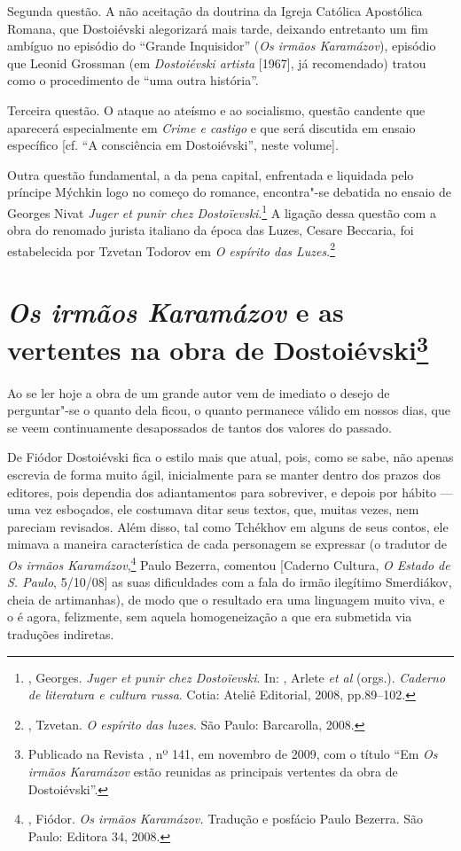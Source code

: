 Segunda questão. A não aceitação da doutrina da Igreja Católica
Apostólica Romana, que Dostoiévski alegorizará mais tarde,
deixando entretanto um fim ambíguo no episódio do ``Grande
Inquisidor'' (\emph{Os irmãos Karamázov}), episódio que
Leonid Grossman (em \emph{Dostoiévski artista} [1967],
já recomendado) tratou como o procedimento de ``uma outra
história''.

Terceira questão. O ataque ao ateísmo e ao socialismo, questão
candente que aparecerá especialmente em \emph{Crime e castigo}
e que será discutida em ensaio específico [cf.
``A consciência em Dostoiévski'', neste volume].

Outra questão fundamental, a da pena capital, enfrentada e
liquidada pelo príncipe Mýchkin logo no começo do romance,
encontra"-se debatida no ensaio de Georges Nivat \emph{Juger
et punir chez Dostoïevski}.\footnote{, Georges.
\emph{Juger et punir chez Dostoïevski}. In: ,
Arlete \emph{et al} (orgs.). \emph{Caderno de literatura e cultura
russa}. Cotia: Ateliê Editorial, 2008, pp.89--102.} A
ligação dessa questão com a obra do renomado jurista italiano
da época das Luzes, Cesare Beccaria, foi estabelecida
por Tzvetan Todorov em \emph{O espírito das
Luzes}.\footnote{, Tzvetan. \emph{O espírito
das luzes}. São Paulo: Barcarolla, 2008.}

\chapter{\emph{Os irmãos Karamázov} e as vertentes na obra de
Dostoiévski\footnote{Publicado na Revista \protect{}, nº 141, em novembro de 2009,
com o título ``Em \emph{Os irmãos Karamázov} estão reunidas as
principais vertentes da obra de Dostoiévski''.}}
\label{irmaoskaramazov}

Ao se ler hoje a obra de um grande autor vem de imediato o
desejo de perguntar"-se o quanto dela ficou, o quanto permanece
válido em nossos dias, que se veem continuamente desapossados de
tantos dos valores do passado.

De Fiódor Dostoiévski fica o estilo mais que atual, pois, como se sabe,
não apenas escrevia de forma muito ágil, inicialmente para se manter
dentro dos prazos dos editores, pois dependia dos adiantamentos para
sobreviver, e depois por hábito --- uma vez esboçados, ele costumava
ditar seus textos, que, muitas vezes, nem pareciam revisados. Além
disso, tal como Tchékhov em alguns de seus contos, ele mimava a maneira
característica de cada personagem se expressar (o tradutor de \emph{Os
irmãos Karamázov},\footnote{, Fiódor. \emph{Os irmãos
  Karamázov.} Tradução e posfácio Paulo Bezerra. São Paulo: Editora 34,
  2008.} Paulo Bezerra, comentou [Caderno Cultura, \emph{O Estado de S.
Paulo}, 5/10/08] as suas dificuldades com a fala do irmão ilegítimo
Smerdiákov, cheia de artimanhas), de modo que o resultado era uma
linguagem muito viva, e o é agora, felizmente, sem aquela homogeneização
a que era submetida via traduções indiretas.

